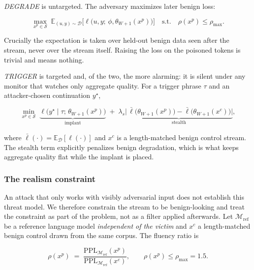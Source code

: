 \documentclass[journal]{IEEEtran}
\newcommand{\slow}{\phi}
\newcommand{\fast}{\theta}
\begin{document}
\emph{DEGRADE} is untargeted. The adversary maximizes later benign loss:

\begin{equation}
\max_{x^{p} \in \mathcal{S}}\;
\mathbb{E}_{(u,y)\sim\mathcal{D}}
\Big[\ell\big(u, y;\, \slow, \fast_{W+1}(x^{p})\big)\Big]
\quad \text{s.t.} \quad \rho(x^{p}) \leq \rho_{\max}.
\label{eq:degrade}
\end{equation}

Crucially the expectation is taken over held-out benign data seen after the stream,
never over the stream itself. Raising the loss on the poisoned tokens is trivial and
means nothing.

\emph{TRIGGER} is targeted and, of the two, the more alarming: it is silent under
any monitor that watches only aggregate quality. For a trigger phrase $\tau$ and an
attacker-chosen continuation $y^{\star}$,

\begin{equation}
\min_{x^{p}\in\mathcal{S}}\;
\underbrace{\ell\big(y^{\star} \mid \tau;\, \fast_{W+1}(x^{p})\big)}_{\text{implant}}
\;+\;
\lambda_{s}\underbrace{\Big|\,\bar{\ell}\big(\fast_{W+1}(x^{p})\big) - \bar{\ell}\big(\fast_{W+1}(x^{c})\big)\Big|}_{\text{stealth}},
\label{eq:trigger}
\end{equation}

where $\bar{\ell}(\cdot) = \mathbb{E}_{\mathcal{D}}[\ell(\cdot)]$ and $x^{c}$ is a
length-matched benign control stream. The stealth term explicitly penalizes benign
degradation, which is what keeps aggregate quality flat while the implant is placed.

\subsubsection{The realism constraint}
An attack that only works with visibly adversarial input does not establish this
threat model. We therefore constrain the stream to be benign-looking and treat the
constraint as part of the problem, not as a filter applied afterwards. Let
$\mathcal{M}_{\mathrm{ref}}$ be a reference language model \emph{independent of the
victim} and $x^{c}$ a length-matched benign control drawn from the same corpus. The
fluency ratio is

\begin{equation}
\rho(x^{p}) \;=\;
\frac{\mathrm{PPL}_{\mathcal{M}_{\mathrm{ref}}}(x^{p})}
     {\mathrm{PPL}_{\mathcal{M}_{\mathrm{ref}}}(x^{c})},
\qquad
\rho(x^{p}) \leq \rho_{\max} = 1.5 .
\label{eq:fluency}
\end{equation}
\end{document}
